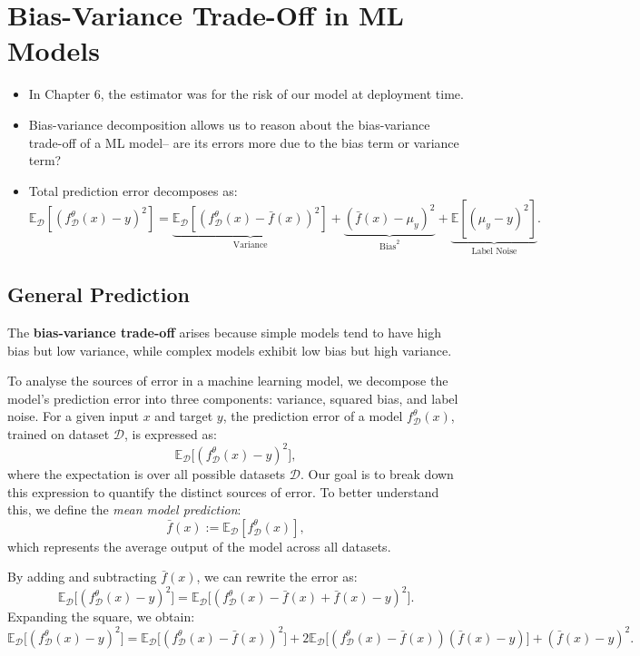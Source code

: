 \section{Bias-Variance Trade-Off in ML Models}

\begin{itemize}
    \item In Chapter 6, the estimator was for the risk of our model at deployment time.
    \item Bias-variance decomposition allows us to reason about the bias-variance trade-off of a ML model– are its errors more due to the bias term or variance term?
    \item Total prediction error decomposes as:
          \[
              \mathbb{E}_{\mathcal{D}}[(f_{\mathcal{D}}^\theta(x) - y)^2] = \underbrace{\mathbb{E}_{\mathcal{D}}[(f_{\mathcal{D}}^\theta(x) - \bar{f}(x))^2]}_{\text{Variance}} + \underbrace{(\bar{f}(x) - \mu_y)^2}_{\text{Bias}^2} + \underbrace{\mathbb{E}[(\mu_y - y)^2]}_{\text{Label Noise}}.
          \]
\end{itemize}





\subsection{General Prediction}
The \textbf{bias-variance trade-off} arises because simple models tend to have high bias but low variance, while complex models exhibit low bias but high variance.

To analyse the sources of error in a machine learning model, we decompose the model's prediction error into three components: variance, squared bias, and label noise. For a given input \( x \) and target \( y \), the prediction error of a model \( f_{\mathcal{D}}^\theta(x) \), trained on dataset \( \mathcal{D} \), is expressed as:
\[
    \mathbb{E}_{\mathcal{D}} \big[ (f_{\mathcal{D}}^\theta(x) - y)^2 \big],
\]
where the expectation is over all possible datasets \( \mathcal{D} \). Our goal is to break down this expression to quantify the distinct sources of error. To better understand this, we define the \textit{mean model prediction}:
\[
    \bar{f}(x) := \mathbb{E}_{\mathcal{D}}[f_{\mathcal{D}}^\theta(x)],
\]
which represents the average output of the model across all datasets.

By adding and subtracting \( \bar{f}(x) \), we can rewrite the error as:
\[
    \mathbb{E}_{\mathcal{D}} \big[ (f_{\mathcal{D}}^\theta(x) - y)^2 \big] = \mathbb{E}_{\mathcal{D}} \big[ (f_{\mathcal{D}}^\theta(x) - \bar{f}(x) + \bar{f}(x) - y)^2 \big].
\]
Expanding the square, we obtain:
\[
    \mathbb{E}_{\mathcal{D}} \big[ (f_{\mathcal{D}}^\theta(x) - y)^2 \big] = \mathbb{E}_{\mathcal{D}} \big[ (f_{\mathcal{D}}^\theta(x) - \bar{f}(x))^2 \big] + 2 \mathbb{E}_{\mathcal{D}} \big[ (f_{\mathcal{D}}^\theta(x) - \bar{f}(x)) (\bar{f}(x) - y) \big] + (\bar{f}(x) - y)^2.
\]

